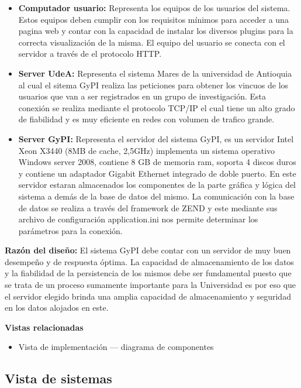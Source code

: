 \documentclass[12pt,oneside,letterpaper]{report}
\begin{document}
\begin{itemize}
 \item \textbf{Computador usuario:} Representa los equipos de los usuarios del sistema. Estos equipos deben cumplir con los requisitos mínimos para acceder a una pagina web y contar con la capacidad de instalar los diversos plugins para la correcta visualización de la misma. El equipo del usuario se conecta con el servidor a través de el protocolo HTTP.
 \item \textbf{Server UdeA:} Representa el sistema Mares de la universidad de Antioquia al cual el sitema GyPI realiza las peticiones para obtener los vincuos de los usuarios que van a ser registrados en un grupo de investigación. Esta conexión se realiza mediante el protocolo TCP/IP el cual tiene un alto grado de fiabilidad y es muy eficiente en redes con volumen de trafico grande.
 \item \textbf{Server GyPI:} Representa el servidor del sistema GyPI, es un servidor Intel Xeon X3440 (8MB de cache, 2,5GHz) implementa un sistema operativo Windows server 2008, contiene 8 GB de memoria ram, soporta 4 discos duros y contiene un adaptador Gigabit Ethernet integrado de doble puerto. En este servidor estaran almacenados los componentes de la parte gráfica y lógica del sistema a demás de la base de datos del mismo. La comunicación con la base de datos se realiza  a través del framework de ZEND y este mediante sus archivo de configuración application.ini nos permite determinar los parámetros para la conexión.
\end{itemize}


\textbf{Razón del diseño:}
El sistema GyPI debe contar con un servidor de muy buen desempeño y de respuesta óptima. La capacidad de almacenamiento de los datos y la fiabilidad de la persistencia de los mismos debe ser fundamental puesto que se trata de un proceso sumamente importante para la Universidad es por eso que el servidor elegido brinda una amplia capacidad de almacenamiento y seguridad en los datos alojados en este.

\textbf{Vistas relacionadas}
\begin{itemize}
 \item Vista de implementación --- diagrama de componentes
\end{itemize}



\subsection{Vista de sistemas}
\end{document}
